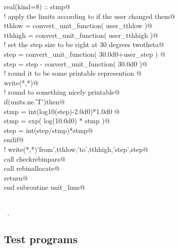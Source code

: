\documentclass[10pt,a4paper,notitlepage]{article}
\begin{document}
\begin{flushleft}
\begin{minipage}{\linewidth}
\begin{list}{}{}
\mbox{}\verb@      real(kind=8) :: stmp@\\
\mbox{}\verb@! apply the limits according to if the user changed them@\\
\mbox{}\verb@      tthlow = convert_unit_function( user_tthlow )@\\
\mbox{}\verb@      tthhigh = convert_unit_function( user_tthhigh )@\\
\mbox{}\verb@! set the step size to be right at 30 degrees twotheta@\\
\mbox{}\verb@      step = convert_unit_function( 30.0d0+user_step ) @\\
\mbox{}\verb@      step = step - convert_unit_function( 30.0d0 )@\\
\mbox{}\verb@! round it to be some printable represention @\\
\mbox{}\verb@      write(*,*)@\\
\mbox{}\verb@! round to something nicely printable@\\
\mbox{}\verb@      if(units.ne.'T')then@\\
\mbox{}\verb@        stmp = int(log10(step)-2.0d0)*1.0d0 @\\
\mbox{}\verb@        stmp = exp( log(10.0d0) * stmp )@\\
\mbox{}\verb@        step = int(step/stmp)*stmp@\\
\mbox{}\verb@      endif@\\
\mbox{}\verb@!      write(*,*)'from',tthlow,'to',tthhigh,'step',step@\\
\mbox{}\verb@      call checkrebinpars@\\
\mbox{}\verb@      call rebinallocate@\\
\mbox{}\verb@      return@\\
\mbox{}\verb@      end subroutine unit_lims@\\
\mbox{}\verb@@\\
\mbox{}\verb@@{\NWsep}
\end{list}
\vspace{-1.5ex}
\footnotesize
\begin{list}{}{\setlength{\itemsep}{-\parsep}\setlength{\itemindent}{-\leftmargin}}
\item \NWtxtMacroRefIn\ .

\item{}
\end{list}
\end{minipage}\vspace{4ex}
\end{flushleft}
\subsection{Test programs}
\end{document}
